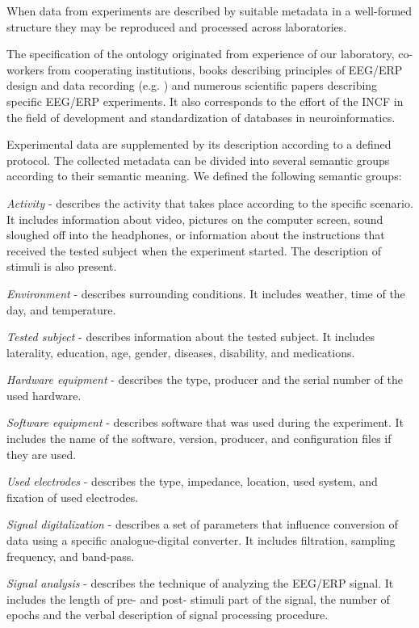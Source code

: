 \documentclass[conference]{IEEEtran}
\begin{document}
When data from experiments are described by suitable metadata in a well-formed structure they may be reproduced and processed across laboratories.

The specification of the ontology originated from experience of our laboratory, co-workers from cooperating institutions, books describing principles of EEG/ERP design and data recording (e.g. \cite{Introduction-to-ERP}) and numerous scientific papers describing specific EEG/ERP experiments. It also corresponds to the effort of the INCF \cite{incf-sustainability-report} in the field of development and standardization of databases in neuroinformatics.

Experimental data are supplemented by its description according to a defined protocol. The collected metadata can be divided into several semantic groups according to their semantic meaning. We defined the following semantic groups:

\emph{Activity} - describes the activity that takes place according to the specific scenario. It includes information about video, pictures on the computer screen, sound sloughed off into the headphones, or information about the instructions that received the tested subject when the experiment started. The description of stimuli is also present.

\emph{Environment} - describes surrounding conditions. It includes weather, time of the day, and temperature.

\emph{Tested subject} - describes information about the tested subject. It includes laterality, education, age, gender, diseases, disability, and medications.

\emph{Hardware equipment} - describes the type, producer and the serial number of the used hardware.

\emph{Software equipment} - describes software that was used during the experiment. It includes the name of the software, version, producer, and configuration files if they are used.

\emph{Used electrodes} - describes the type, impedance, location, used system, and fixation of used electrodes.

\emph{Signal digitalization} - describes a set of parameters that influence conversion of data using a specific analogue-digital converter. It includes filtration, sampling frequency, and band-pass.

\emph{Signal analysis} - describes the technique of analyzing the EEG/ERP signal. It includes the length of pre- and post- stimuli part of the signal, the number of epochs and the verbal description of signal processing procedure.
\end{document}
